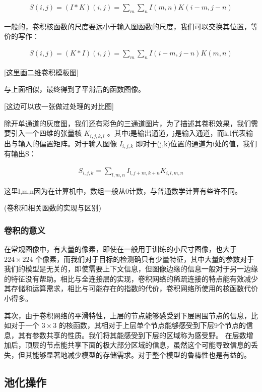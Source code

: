 \begin{eqnarray}
    S(i,j) = (I \ast K)(i,j) = \sum_{m} \sum_n I(m,n)K(i-m,j-n)
\end{eqnarray}

一般的，卷积核函数的尺度要远小于输入图函数的尺度，我们可以交换其位置，等价的写作：

\begin{eqnarray}
    S(i,j) = (K \ast I)(i,j) = \sum_{m} \sum_{n} I(i-m,j-n)K(m,n)
\end{eqnarray}

[这里画二维卷积模板图]

与上面相似，最终得到了平滑后的函数图像。

[这边可以放一张做过处理的对比图]

除开单通道的灰度图，我们还有彩色的三通道图片，为了描述其卷积效果，我们需要引入一个四维的张量核 $ K_{i,j,k,l} $ 。其中i是输出通道，j是输入通道，而k,l代表输出与输入的偏置矩阵。对于输入图像 $ I_{i,j,k} $ 即对于(j,k)位置的通道为i处的值，我们有输出S：

\begin{eqnarray}
    S_{i,j,k} = \sum_{l,m,n}I_{l,j+m,k+n}K_{i,l,m,n}
\end{eqnarray}

这里l,m,n因为在计算机中，数组一般从0计数，与普通数学计算有些许不同。

(卷积和相关函数的实现与区别)

\subsubsection{卷积的意义}

在常规图像中，有大量的像素，即使在一般用于训练的小尺寸图像，也大于 $ 224 \times 224 $ 个像素，而我们对于目标的检测确只有少量特征，其中大量的参数对于我们的模型是无关的，即使需要上下文信息，但图像边缘的信息一般对于另一边缘的特征没有帮助。相比与全连接层的实现，卷积网络的稀疏连接的特点能有效减少其存储和运算需求，相比与可能存在的指数的代价，卷积网络所使用的核函数代价小得多。

其次，由于卷积网络的平滑特性，上层的节点能够感受到下层周围节点的信息，比如对于一个 $ 3 \times 3 $ 的核函数，其相对于上层单个节点能够感受到下层9个节点的信息，其有参数共享的性质。我们将其能感受到下层的区域称为感受野。
在层数增加后，顶层的节点能共享下面的极大部分区域的信息，虽然这个可能导致信息的丢失，但其能够显著地减少模型的存储需求。对于整个模型的鲁棒性也是有益的。

\subsection{池化操作}

